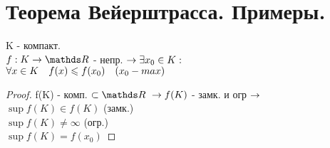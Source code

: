 \documentclass[geometry.tex]{subfiles}
\begin{document}
  \section{Теорема Вейерштрасса. Примеры.}

  \begin{theorem} [Вейерштрасса]
      K - компакт.\\
      $f: K \rightarrow \R $ - непр. $\rightarrow \exists x_0 \in K:$\\
      $\forall x \in K \quad f(x) \leqslant f(x_0) \quad (x_0 - max)$
  \end{theorem}

  \begin{proof}
      f(K) - комп. $\subset \R \  \ra f(K)$ - замк. и огр $\rightarrow$\\
      $\sup{f(K)} \in f(K)$ (замк.)\\
      $\sup{f(K)} \neq \infty$ (огр.)\\
      $\sup{f(K)} = f(x_0)$
  \end{proof}
\end{document}
